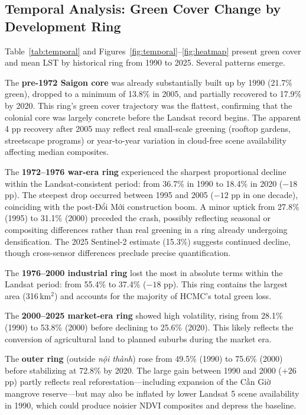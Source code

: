 \documentclass[preprint,12pt]{elsarticle}
\begin{document}
\subsection{Temporal Analysis: Green Cover Change by Development Ring}

Table~\ref{tab:temporal} and Figures~\ref{fig:temporal}--\ref{fig:heatmap} present green cover and mean LST by historical ring from 1990 to 2025. Several patterns emerge.

The \textbf{pre-1972 Saigon core} was already substantially built up by 1990 (21.7\% green), dropped to a minimum of 13.8\% in 2005, and partially recovered to 17.9\% by 2020. This ring's green cover trajectory was the flattest, confirming that the colonial core was largely concrete before the Landsat record begins. The apparent 4 pp recovery after 2005 may reflect real small-scale greening (rooftop gardens, streetscape programs) or year-to-year variation in cloud-free scene availability affecting median composites.

The \textbf{1972--1976 war-era ring} experienced the sharpest proportional decline within the Landsat-consistent period: from 36.7\% in 1990 to 18.4\% in 2020 ($-18$ pp). The steepest drop occurred between 1995 and 2005 ($-12$ pp in one decade), coinciding with the post-Đổi Mới construction boom. A minor uptick from 27.8\% (1995) to 31.1\% (2000) preceded the crash, possibly reflecting seasonal or compositing differences rather than real greening in a ring already undergoing densification. The 2025 Sentinel-2 estimate (15.3\%) suggests continued decline, though cross-sensor differences preclude precise quantification.

The \textbf{1976--2000 industrial ring} lost the most in absolute terms within the Landsat period: from 55.4\% to 37.4\% ($-18$ pp). This ring contains the largest area (316\,km$^2$) and accounts for the majority of HCMC's total green loss.

The \textbf{2000--2025 market-era ring} showed high volatility, rising from 28.1\% (1990) to 53.8\% (2000) before declining to 25.6\% (2020). This likely reflects the conversion of agricultural land to planned suburbs during the market era.

The \textbf{outer ring} (outside \textit{nội thành}) rose from 49.5\% (1990) to 75.6\% (2000) before stabilizing at 72.8\% by 2020. The large gain between 1990 and 2000 ($+26$ pp) partly reflects real reforestation---including expansion of the Cần Giờ mangrove reserve---but may also be inflated by lower Landsat 5 scene availability in 1990, which could produce noisier NDVI composites and depress the baseline.
\end{document}
